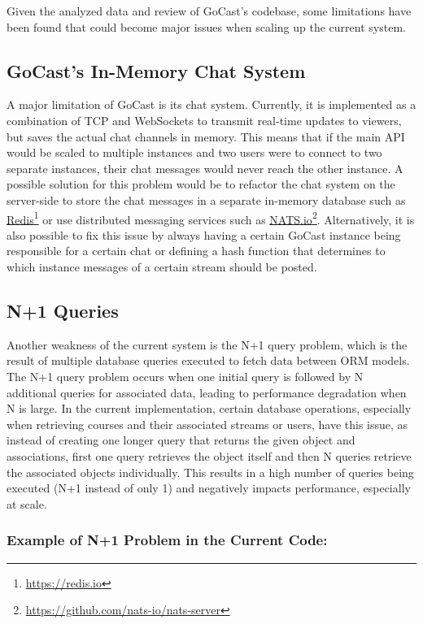 Given the analyzed data and review of GoCast's codebase, some limitations have been found that could become major issues when scaling up the current system.

\subsection{GoCast's In-Memory Chat System}

A major limitation of GoCast is its chat system. Currently, it is implemented as a combination of TCP and WebSockets to transmit real-time updates to viewers, but saves the actual chat channels in memory. This means that if the main \ac{API} would be scaled to multiple instances and two users were to connect to two separate instances, their chat messages would never reach the other instance. A possible solution for this problem would be to refactor the chat system on the server-side to store the chat messages in a separate in-memory database such as \href{https://redis.io}{Redis}\footnote{\url{https://redis.io}} or use distributed messaging services such as \href{https://github.com/nats-io/nats-server}{NATS.io}\footnote{\url{https://github.com/nats-io/nats-server}}. Alternatively, it is also possible to fix this issue by always having a certain GoCast instance being responsible for a certain chat or defining a hash function that determines to which instance messages of a certain stream should be posted.

\subsection{N+1 Queries}

Another weakness of the current system is the N+1 query problem, which is the result of multiple database queries executed to fetch data between \ac{ORM} models. The N+1 query problem occurs when one initial query is followed by N additional queries for associated data, leading to performance degradation when N is large. In the current implementation, certain database operations, especially when retrieving courses and their associated streams or users, have this issue, as instead of creating one longer query that returns the given object and associations, first one query retrieves the object itself and then N queries retrieve the associated objects individually. This results in a high number of queries being executed (N+1 instead of only 1) and negatively impacts performance, especially at scale.

\subsubsection{Example of N+1 Problem in the Current Code:}

